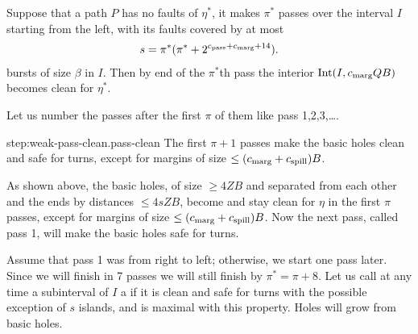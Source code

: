 \documentclass[11pt]{memoir}
\theoremstyle{definition} %
\renewcommand{\le}{\leq}
\renewcommand{\ge}{\geq}
\def\B{B}
\newcommand{\Int}{\mathrm{Int}} %
\newcommand{\passno}{\pi}
\newcommand{\Q}{Q} %
\newcommand{\s}{s} %
\newcommand{\Z}{Z} %
\newcommand{\cns}[1]{c_{\textrm{\upshape #1}}}
\newcommand{\CMarg}{\cns{marg}}
\newcommand{\CPass}{\cns{pass}}
\newcommand{\CSpill}{\cns{spill}}
\begin{document}
\begin{lemma}\label{lem:weak-pass-clean}
  Suppose that a path \( P \) has no faults of \( \eta^{*} \),
  it makes \( \passno^{*} \) passes over the interval \( I \) starting from the left,
  with its faults covered by at most 
\begin{align*}
 \s=\passno^{*}(\passno^{*}+2^{\CPass+\CMarg + 14}).
\end{align*}
bursts of size \( \beta \) in \( I \).
Then by end of the \( \passno ^{*} \)th pass the interior
\( \Int(I, \CMarg\Q\B) \) becomes clean for \( \eta^{*} \).
\end{lemma}

\begin{Proof}
  Let us number the passes after the first \( \passno \) of them like pass 1,2,3,\dots.
  \begin{step+}{step:weak-pass-clean.pass-clean}
    The first \( \passno+1 \) passes make the basic holes clean and safe for turns, except
    for margins of size \( \le(\CMarg+\CSpill)\B \).
  \end{step+}
  \begin{pproof}
 As shown above, the basic holes, of size \( \ge 4\Z\B \) and
 separated from each other and the ends by distances \( \le 4\s\Z\B \),
 become and stay clean for \( \eta \) in the first \( \passno \) passes, except for margins
 of size \( \le(\CMarg+\CSpill)\B \).
 Now the next pass, called pass 1, will make the basic holes safe for turns.
\end{pproof} %

Assume that pass 1 was from right to left; otherwise, we start one pass later.
Since we will finish in 7 passes we will still finish by \( \passno^{*}=\passno+8 \).
Let us call at any time a subinterval of \( I \) a  if it is clean and safe for turns
with the possible exception of  \( \s \) islands, and is maximal with this property.
Holes will grow from basic holes.


\end{Proof}
\end{document}
